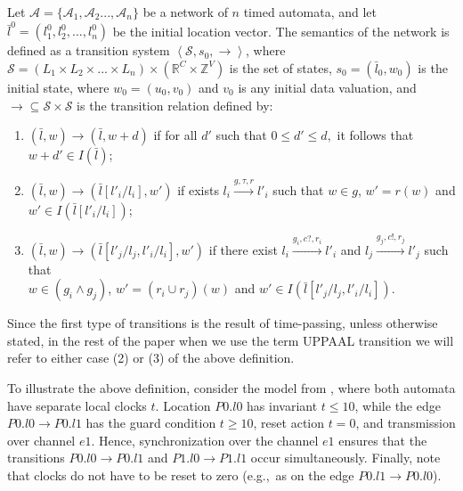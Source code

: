 \begin{definition}
\label{def:semantics}
Let $\mathcal{A}=\{\mathcal{A}_1,\mathcal{A}_2...,\mathcal{A}_n \}$ be a network of $n$ timed automata, and let $\bar{l}^0=(l_1^0,l_2^0,...,l_n^0)$ be the initial location vector. The semantics of the network is defined as a transition system $\left<\mathcal{S},s_0,\rightarrow\right>$, where $\mathcal{S}=(L_1\times L_2\times ... \times L_n)\times (\mathbb{R}^C\times \mathbb{Z}^V)$ is the set of states, $s_0=(\bar{l}_0,w_0)$ is the initial state, where $w_0=(u_0,v_0)$ and $v_0$ is any initial data valuation, and $\rightarrow \subseteq \mathcal{S}\times\mathcal{S}$ is the transition relation defined by:
\begin{enumerate}
\item 
$(\bar{l},w) \rightarrow (\bar{l},w+d)$ if for all $d'$ such that $0\leq d'\leq d,$ it follows that $w+d'\in I(\bar{l})$;

\item 
$(\bar{l},w) \rightarrow (\bar{l}[l'_i/l_i],w')$ if  exists $l_i \xrightarrow{g,\tau,r} l'_i$ such that $w\in g$, $w'=r(w)$ and $w'\in I(\bar{l}[l'_i/l_i])$;

\item
$(\bar{l},w) \rightarrow (\bar{l}[l'_j/l_j,l'_i/l_i],w')$ if there exist $l_i \xrightarrow{g_i,c?,r_i} l'_i$ and $l_j \xrightarrow{g_j,c!,r_j} l'_j$ such that \\$w\in (g_i\wedge g_j)$, $w'=(r_i \cup r_j)(w)$ and $w'\in I(\bar{l}[l'_j/l_j,l'_i/l_i])$.

\end{enumerate}
\end{definition} 
Since the first type of transitions is the result of time-passing, unless otherwise stated, in the rest of the paper when we use the term UPPAAL transition we will refer to either case (2) or (3) of the above definition. 
 


To illustrate the above definition, consider the model from , where both automata have separate local clocks $t$. Location $P0.l0$ has invariant $t\leq 10$, while the edge $P0.l0\rightarrow P0.l1$ has the guard condition $t\geq 10$, reset action $t=0$, and transmission over channel $e1$. Hence, synchronization over the channel $e1$ ensures that the transitions $P0.l0\rightarrow P0.l1$ and $P1.l0\rightarrow P1.l1$ occur simultaneously. Finally, note that clocks do not have to be reset to zero (e.g.,~as on the edge $P0.l1\rightarrow P0.l0$). 


